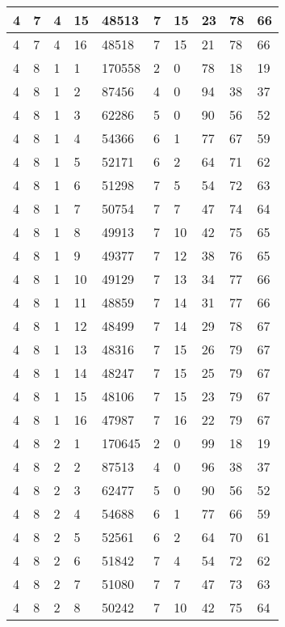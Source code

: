\begin{table}[!ht]
\begin{tabular}{|l|l|l|l|l|l|l|l|l|l|}
        4 & 7 & 4 & 15 & 48513 & 7 & 15 & 23 & 78 & 66 \\ \hline
        4 & 7 & 4 & 16 & 48518 & 7 & 15 & 21 & 78 & 66 \\ \hline
        4 & 8 & 1 & 1 & 170558 & 2 & 0 & 78 & 18 & 19 \\ \hline
        4 & 8 & 1 & 2 & 87456 & 4 & 0 & 94 & 38 & 37 \\ \hline
        4 & 8 & 1 & 3 & 62286 & 5 & 0 & 90 & 56 & 52 \\ \hline
        4 & 8 & 1 & 4 & 54366 & 6 & 1 & 77 & 67 & 59 \\ \hline
        4 & 8 & 1 & 5 & 52171 & 6 & 2 & 64 & 71 & 62 \\ \hline
        4 & 8 & 1 & 6 & 51298 & 7 & 5 & 54 & 72 & 63 \\ \hline
        4 & 8 & 1 & 7 & 50754 & 7 & 7 & 47 & 74 & 64 \\ \hline
        4 & 8 & 1 & 8 & 49913 & 7 & 10 & 42 & 75 & 65 \\ \hline
        4 & 8 & 1 & 9 & 49377 & 7 & 12 & 38 & 76 & 65 \\ \hline
        4 & 8 & 1 & 10 & 49129 & 7 & 13 & 34 & 77 & 66 \\ \hline
        4 & 8 & 1 & 11 & 48859 & 7 & 14 & 31 & 77 & 66 \\ \hline
        4 & 8 & 1 & 12 & 48499 & 7 & 14 & 29 & 78 & 67 \\ \hline
        4 & 8 & 1 & 13 & 48316 & 7 & 15 & 26 & 79 & 67 \\ \hline
        4 & 8 & 1 & 14 & 48247 & 7 & 15 & 25 & 79 & 67 \\ \hline
        4 & 8 & 1 & 15 & 48106 & 7 & 15 & 23 & 79 & 67 \\ \hline
        4 & 8 & 1 & 16 & 47987 & 7 & 16 & 22 & 79 & 67 \\ \hline
        4 & 8 & 2 & 1 & 170645 & 2 & 0 & 99 & 18 & 19 \\ \hline
        4 & 8 & 2 & 2 & 87513 & 4 & 0 & 96 & 38 & 37 \\ \hline
        4 & 8 & 2 & 3 & 62477 & 5 & 0 & 90 & 56 & 52 \\ \hline
        4 & 8 & 2 & 4 & 54688 & 6 & 1 & 77 & 66 & 59 \\ \hline
        4 & 8 & 2 & 5 & 52561 & 6 & 2 & 64 & 70 & 61 \\ \hline
        4 & 8 & 2 & 6 & 51842 & 7 & 4 & 54 & 72 & 62 \\ \hline
        4 & 8 & 2 & 7 & 51080 & 7 & 7 & 47 & 73 & 63 \\ \hline
        4 & 8 & 2 & 8 & 50242 & 7 & 10 & 42 & 75 & 64 \\ \hline

\end{tabular}
\end{table}
